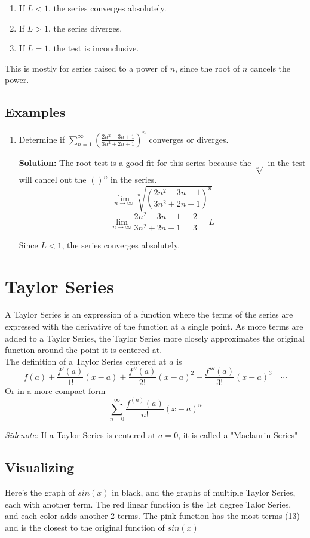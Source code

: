 \documentclass[12pt]{report}
\begin{document}
\begin{enumerate}
	\item If $ L < 1 $, the series converges absolutely.
	\item If $ L > 1 $, the series diverges.
	\item If $ L = 1 $, the test is inconclusive. 
\end{enumerate}

\noindent This is mostly for series raised to a power of $n$, since the root of $n$ cancels the power.


\subsection*{Examples}
\begin{enumerate}
	\item Determine if $\sum_{n=1}^{\infty} \left( \frac{2n^2-3n+1}{3n^2+2n+1} \right)^n$ converges or diverges.
	
	\textbf{Solution:} The root test is a good fit for this series because the $\sqrt[n]{}$ in the test will cancel out the $()^n$ in the series.
		$$ \lim_{n\to\infty} \sqrt[n]{\left( \frac{2n^2-3n+1}{3n^2+2n+1} \right)^n} $$
		$$ \lim_{n\to\infty} \frac{2n^2-3n+1}{3n^2+2n+1} = \frac{2}{3} = L $$
		
	Since $ L < 1 $, the series converges absolutely. 
\end{enumerate}


\clearpage

\section{Taylor Series}
A Taylor Series is an expression of a function where the terms of the series are expressed with the derivative of the function at a single point. As more terms are added to a Taylor Series, the Taylor Series more closely approximates the original function around the point it is centered at.\\

\noindent The definition of a Taylor Series centered at $ a $ is
$$
	f(a) + \frac{f'(a)}{1!}(x-a) + \frac{f''(a)}{2!}(x-a)^2 + \frac{f'''(a)}{3!}(x-a)^3 \quad \cdots
$$
Or in a more compact form
$$
	\sum_{n=0}^{\infty} \frac{f^{(n)}(a)}{n!}(x-a)^n
$$

\noindent \textit{Sidenote:} If a Taylor Series is centered at $a=0$, it is called a "Maclaurin Series"


\subsection*{Visualizing}
Here's the graph of $ sin(x) $ in black, and the graphs of multiple Taylor Series, each with another term. The red linear function is the 1st degree Talor Series, and each color adds another 2 terms. The pink function has the most terms (13) and is the closest to the original function of $ sin(x) $
\end{document}

